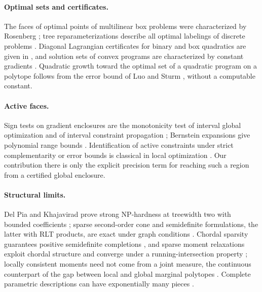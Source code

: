 \paragraph{Optimal sets and certificates.}
The faces of optimal points of multilinear box problems were characterized by Rosenberg
\cite{Rosenberg1972}; tree reparameterizations describe all optimal labelings of discrete
problems \cite{WainwrightJaakkolaWillsky2005,Werner2007}. Diagonal Lagrangian certificates for
binary and box quadratics are given in \cite{BeckTeboulle2000,JeyakumarRubinovWu2006,Pinar2004,
LiWuQuan2015}, and solution sets of convex programs are characterized by constant gradients
\cite{Mangasarian1988,BurkeFerris1991,JeyakumarLeeDinh2004}. Quadratic growth toward the optimal
set of a quadratic program on a polytope follows from the error bound of Luo and Sturm
\cite{LuoSturm2000}, without a computable constant.

\paragraph{Active faces.}
Sign tests on gradient enclosures are the monotonicity test of interval global optimization
\cite{Hansen1980,HansenWalster2004} and of interval constraint propagation
\cite{ArayaTrombettoniNeveu2010}; Bernstein expansions give polynomial range bounds
\cite{Garloff1986}. Identification of active constraints under strict complementarity or error
bounds is classical in local optimization \cite{BurkeMore1988,Wright1993,FacchineiFischerKanzow1998}.
Our contribution there is only the explicit precision term for reaching such a region from a
certified global enclosure.

\paragraph{Structural limits.}
Del Pia and Khajavirad prove strong NP-hardness at treewidth two with bounded coefficients
\cite{DelPiaKhajavirad2026}; sparse second-order cone and semidefinite formulations, the latter with RLT products, are exact
under graph conditions \cite{DeyKhajavirad2026,Khajavirad2026SparseSDP}. Chordal sparsity guarantees
positive semidefinite completions \cite{GroneEtAl1984,VandenbergheAndersen2015}, and sparse
moment relaxations exploit chordal structure and converge under a running-intersection property
\cite{Lasserre2001,WakiEtAl2006,Lasserre2006,Laurent2009}; locally consistent moments need not
come from a joint measure, the continuous counterpart of the gap between local and global
marginal polytopes \cite{SheraliAdams1990,WainwrightJordan2008}. Complete parametric descriptions
can have exponentially many pieces \cite{Murty1980,MairalYu2012,GartnerJaggiMaria2012}.
